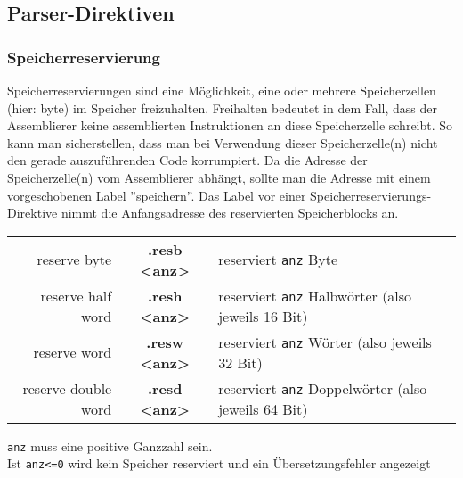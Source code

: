 {\subsection{Parser-Direktiven}

\subsubsection{Speicherreservierung}
Speicherreservierungen sind eine Möglichkeit, eine oder mehrere Speicherzellen (hier: byte) im Speicher freizuhalten. Freihalten bedeutet in dem Fall, dass der Assemblierer keine assemblierten Instruktionen an diese Speicherzelle schreibt.
So kann man sicherstellen, dass man bei Verwendung dieser Speicherzelle(n) nicht den gerade auszuführenden Code korrumpiert.
Da die Adresse der Speicherzelle(n) vom Assemblierer abhängt, sollte man die Adresse mit einem vorgeschobenen Label ''speichern''. Das Label vor einer Speicherreservierungs-Direktive nimmt die Anfangsadresse des reservierten Speicherblocks an.\\

\begin{centering}
	\begin{tabular}{rcl}
		reserve byte & \textbf{.resb <anz>} & reserviert \texttt{anz} Byte\\
		reserve half word & \textbf{.resh <anz>} & reserviert \texttt{anz} Halbwörter (also jeweils 16 Bit)\\
		reserve word & \textbf{.resw <anz>} & reserviert \texttt{anz} Wörter (also jeweils 32 Bit)\\
		reserve double word & \textbf{.resd <anz>} & reserviert \texttt{anz} Doppelwörter (also jeweils 64 Bit)\\
	\end{tabular}
\end{centering}

\begin{warningblock}
	\texttt{anz} muss eine positive Ganzzahl sein.\\
	Ist \texttt{anz<=0} wird kein Speicher reserviert und ein Übersetzungsfehler angezeigt
\end{warningblock}

}
